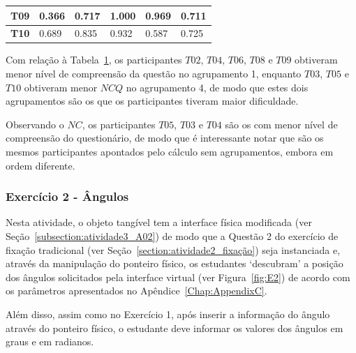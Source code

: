 \begin{table}[htbp]
\begin{tabular}{|c|lllll|}
		\textbf{T09} & \multicolumn{1}{l|}{0.366} & \multicolumn{1}{l|}{0.717} & \multicolumn{1}{l|}{1.000} & \multicolumn{1}{l|}{0.969} & 0.711 \\ \hline
		\rowcolor[HTML]{F2F2F2} 
		\textbf{T10} & \multicolumn{1}{l|}{\cellcolor[HTML]{F2F2F2}0.689} & \multicolumn{1}{l|}{\cellcolor[HTML]{F2F2F2}0.835} & \multicolumn{1}{l|}{\cellcolor[HTML]{F2F2F2}0.932} & \multicolumn{1}{l|}{\cellcolor[HTML]{F2F2F2}0.587} & 0.725 \\ \hline
	\end{tabular}
	\label{tab:F3A1_NC_casos_comagrupamento}
\end{table}

Com relação à Tabela~\ref{tab:F3A1_NC_casos_comagrupamento}, os participantes $T02$, $T04$, $T06$, $T08$ e $T09$ obtiveram menor nível de compreensão da questão no agrupamento 1, enquanto $T03$, $T05$ e $T10$ obtiveram menor $NCQ$ no agrupamento 4, de modo que estes dois agrupamentos são os que os participantes tiveram maior dificuldade.

Observando o $NC$, os participantes $T05$, $T03$ e $T04$ são os com menor nível de compreensão do questionário, de modo que é interessante notar que são os mesmos participantes apontados pelo cálculo sem agrupamentos, embora em ordem diferente.


\subsubsection{Exercício 2 - Ângulos}\label{subsubsec:F3A2}

Nesta atividade, o objeto tangível tem a interface física modificada (ver Seção~\ref{subsection:atividade3_A02}) de modo que a Questão 2 do exercício de fixação tradicional (ver Seção~\ref{section:atividade2_fixação}) seja instanciada e, através da manipulação do ponteiro físico, os estudantes `descubram' a posição dos ângulos solicitados pela interface virtual (ver Figura~\ref{fig:E2}) de acordo com os parâmetros apresentados no Apêndice~\ref{Chap:AppendixC}.%

Além disso, assim como no Exercício 1, após inserir a informação do ângulo através do ponteiro físico, o estudante deve informar os valores dos ângulos em graus e em radianos.

